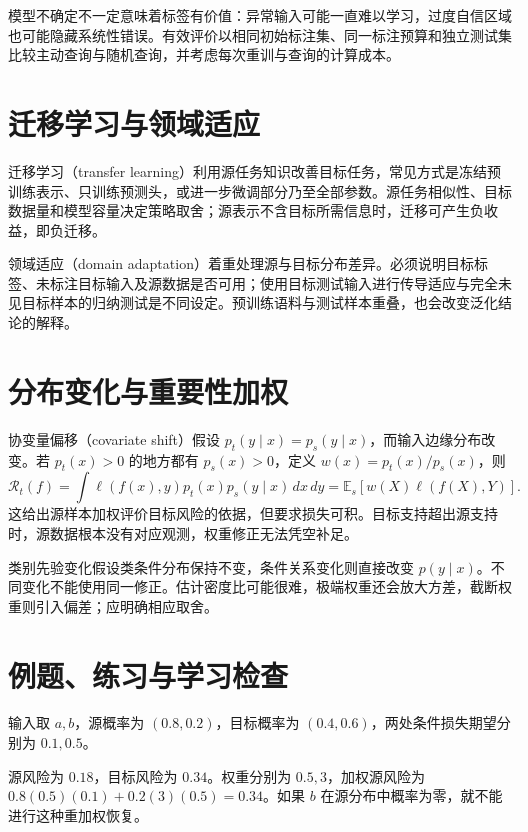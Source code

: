 \documentclass[UTF8,12pt,a4paper,fontset=fandol]{ctexbook}
\begin{document}
模型不确定不一定意味着标签有价值：异常输入可能一直难以学习，过度自信区域也可能隐藏系统性错误。有效评价以相同初始标注集、同一标注预算和独立测试集比较主动查询与随机查询，并考虑每次重训与查询的计算成本。

\section{迁移学习与领域适应}

迁移学习（transfer learning）利用源任务知识改善目标任务，常见方式是冻结预训练表示、只训练预测头，或进一步微调部分乃至全部参数。源任务相似性、目标数据量和模型容量决定策略取舍；源表示不含目标所需信息时，迁移可产生负收益，即负迁移。

领域适应（domain adaptation）着重处理源与目标分布差异。必须说明目标标签、未标注目标输入及源数据是否可用；使用目标测试输入进行传导适应与完全未见目标样本的归纳测试是不同设定。预训练语料与测试样本重叠，也会改变泛化结论的解释。

\section{分布变化与重要性加权}

协变量偏移（covariate shift）假设 $p_t(y\mid x)=p_s(y\mid x)$，而输入边缘分布改变。若 $p_t(x)>0$ 的地方都有 $p_s(x)>0$，定义 $w(x)=p_t(x)/p_s(x)$，则
\begin{equation}
 \mathcal R_t(f)=\int\ell(f(x),y)p_t(x)p_s(y\mid x)\,dx\,dy
 =\mathbb E_s[w(X)\ell(f(X),Y)].
 \label{eq:ml-covariate-shift}
\end{equation}
这给出源样本加权评价目标风险的依据，但要求损失可积。目标支持超出源支持时，源数据根本没有对应观测，权重修正无法凭空补足。

类别先验变化假设类条件分布保持不变，条件关系变化则直接改变 $p(y\mid x)$。不同变化不能使用同一修正。估计密度比可能很难，极端权重还会放大方差，截断权重则引入偏差；应明确相应取舍。

\section{例题、练习与学习检查}

\begin{example}[离散协变量偏移]
输入取 $a,b$，源概率为 $(0.8,0.2)$，目标概率为 $(0.4,0.6)$，两处条件损失期望分别为 $0.1,0.5$。
\end{example}
\begin{solve}
源风险为 $0.18$，目标风险为 $0.34$。权重分别为 $0.5,3$，加权源风险为 $0.8(0.5)(0.1)+0.2(3)(0.5)=0.34$。如果 $b$ 在源分布中概率为零，就不能进行这种重加权恢复。
\end{solve}
\end{document}
